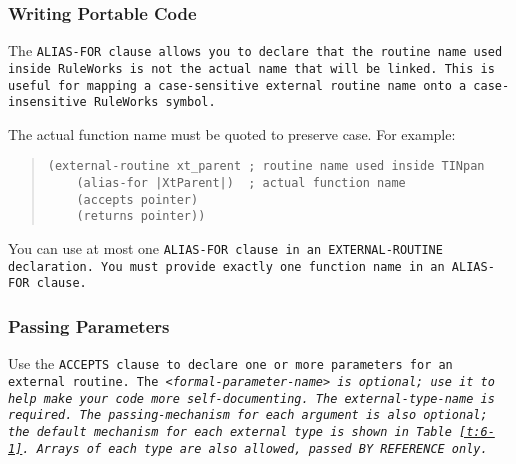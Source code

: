 \subsubsection{Writing Portable Code}

The \tt{ALIAS-FOR} clause allows you to declare that the routine name
used inside RuleWorks is not the actual name that will be linked. This
is useful for mapping a case-sensitive external routine name onto a
case-insensitive RuleWorks symbol.

The actual function name must be quoted to preserve case. For example:

\begin{quote}
\begin{verbatim}
(external-routine xt_parent ; routine name used inside TINpan
    (alias-for |XtParent|)  ; actual function name
    (accepts pointer)
    (returns pointer))
\end{verbatim}
\end{quote}

You can use at most one \tt{ALIAS-FOR} clause in an \tt{EXTERNAL-ROUTINE}
declaration. You must provide exactly one function name in an
\tt{ALIAS-FOR} clause.

\subsubsection{Passing Parameters}

Use the \tt{ACCEPTS} clause to declare one or more parameters for an
external routine. The \verb|<|\it{formal-parameter-name}\verb|>| is
optional; use it to help make your code more self-documenting. The
external-type-name is required. The passing-mechanism for each
argument is also optional; the default mechanism for each external
type is shown in Table~\ref{t:6-1}. Arrays of each type are also
allowed, passed \tt{BY REFERENCE} only.

